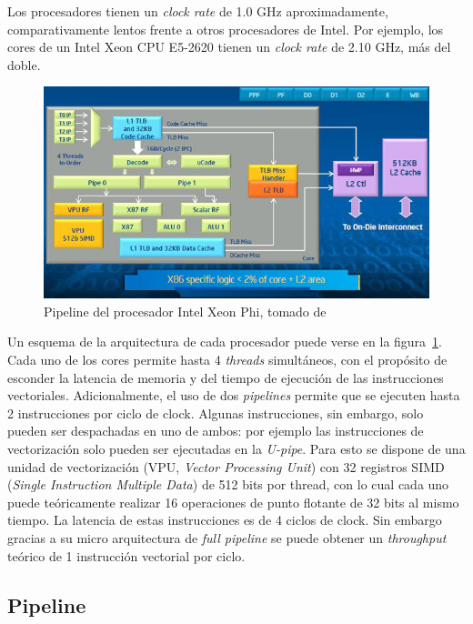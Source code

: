 Los procesadores tienen un \textit{clock rate} de 1.0 GHz aproximadamente, comparativamente lentos frente
a otros procesadores de Intel. Por ejemplo, los cores de un Intel Xeon CPU E5-2620 tienen un \textit{clock rate}
de 2.10 GHz, m\'as del doble.

\begin{figure}[htbp]
   \centering
   \includegraphics[width=\plotwidth]{images/xeon-phi-core.jpg}
   \caption{Pipeline del procesador Intel Xeon Phi, tomado de~\cite{XeonPhiArchArticle} }
   \label{fig::xeon_phi_core}
\end{figure}

Un esquema de la arquitectura de cada procesador puede verse en la figura~\ref{fig::xeon_phi_core}. Cada uno de los cores
permite hasta 4 \textit{threads} simult\'aneos, con el prop\'osito de esconder la latencia de memoria y del tiempo de ejecuci\'on de
las instrucciones vectoriales. Adicionalmente, el uso de dos \textit{pipelines} permite que se ejecuten hasta 2
instrucciones por ciclo de clock.  Algunas instrucciones, sin embargo, solo pueden ser despachadas en uno de ambos:
por ejemplo las instrucciones de vectorizaci\'on solo pueden ser ejecutadas en la \textit{U-pipe}. Para esto se dispone
de una unidad de vectorizaci\'on (VPU, \textit{Vector Processing Unit}) con 32 registros SIMD (\textit{Single Instruction
Multiple Data}) de 512 bits por thread, con lo cual cada uno puede te\'oricamente realizar 16 operaciones de punto flotante de
32 bits al mismo tiempo. La latencia de estas instrucciones es de 4 ciclos de clock. Sin embargo gracias a su micro
arquitectura de \textit{full pipeline} se puede obtener un \textit{throughput} te\'orico de 1 instrucci\'on vectorial por ciclo.

\subsection{Pipeline}


